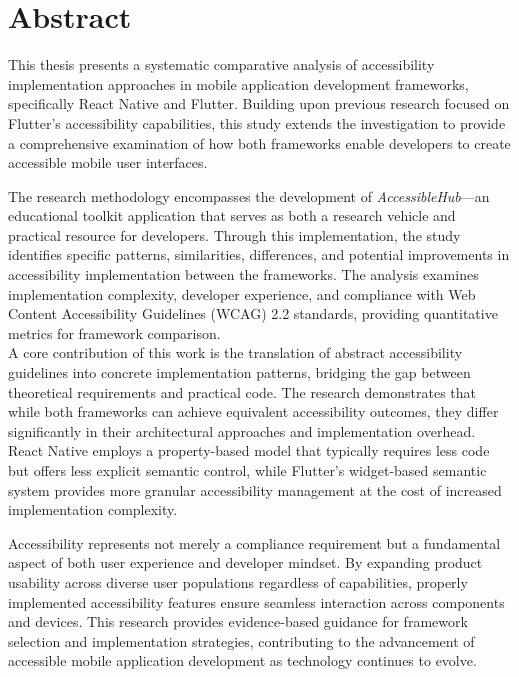 \cleardoublepage
{}
{}
\begingroup
\let\clearpage\relax
\let\cleardoublepage\relax
\chapter*{Abstract}
This thesis presents a systematic comparative analysis of accessibility implementation approaches in mobile application development frameworks, specifically React Native and Flutter. Building upon previous research focused on Flutter's accessibility capabilities, this study extends the investigation to provide a comprehensive examination of how both frameworks enable developers to create accessible mobile user interfaces.

The research methodology encompasses the development of \textit{AccessibleHub}—an educational toolkit application that serves as both a research vehicle and practical resource for developers. Through this implementation, the study identifies specific patterns, similarities, differences, and potential improvements in accessibility implementation between the frameworks. The analysis examines implementation complexity, developer experience, and compliance with Web Content Accessibility Guidelines (WCAG) 2.2 standards, providing quantitative metrics for framework comparison. \\

A core contribution of this work is the translation of abstract accessibility guidelines into concrete implementation patterns, bridging the gap between theoretical requirements and practical code. The research demonstrates that while both frameworks can achieve equivalent accessibility outcomes, they differ significantly in their architectural approaches and implementation overhead. React Native employs a property-based model that typically requires less code but offers less explicit semantic control, while Flutter's widget-based semantic system provides more granular accessibility management at the cost of increased implementation complexity. 

\pagebreak

Accessibility represents not merely a compliance requirement but a fundamental aspect of both user experience and developer mindset. By expanding product usability across diverse user populations regardless of capabilities, properly implemented accessibility features ensure seamless interaction across components and devices. This research provides evidence-based guidance for framework selection and implementation strategies, contributing to the advancement of accessible mobile application development as technology continues to evolve.
\endgroup
\vfill
